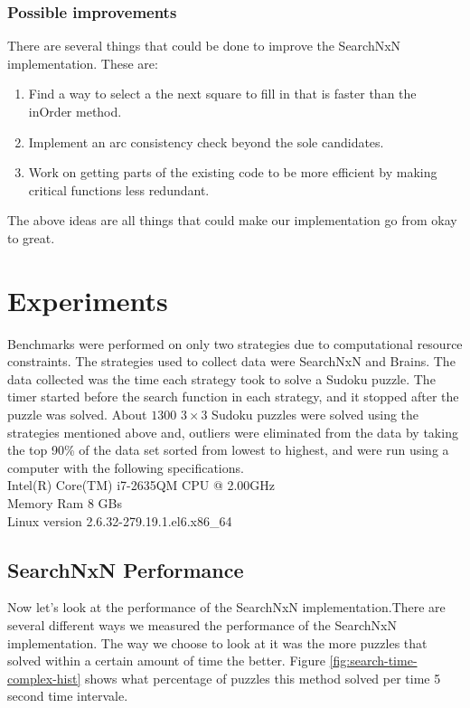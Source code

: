 \documentclass[letterpaper]{article}
\begin{document}
\subsubsection{Possible improvements}
There are several things that could be done to improve the SearchNxN implementation. These are:
\begin{enumerate}
\item Find a way to select a the next square to fill in that is faster than the inOrder method.
\item Implement an arc consistency check beyond the sole candidates.
\item Work on getting parts of the existing code to be more efficient by making critical functions less redundant. 
\end{enumerate}
The above ideas are all things that could make our implementation go from okay to great.

\section{Experiments}
Benchmarks were performed on only two strategies due to computational resource constraints. The strategies used to collect data were SearchNxN and Brains. The data collected was the time each strategy took to solve a Sudoku puzzle. The timer started before the search function in each strategy, and it stopped after the puzzle was solved. About $1300$ $3 \times 3$ Sudoku puzzles were solved using the strategies mentioned above and, outliers were eliminated from the data by taking the top 90\% of the data set sorted from lowest to highest, and were run using a computer with the following specifications.\\

Intel(R) Core(TM) i7-2635QM CPU @ 2.00GHz\\
\indent Memory Ram 8 GBs\\
\indent Linux version 2.6.32-279.19.1.el6.x86\_64

\subsection{SearchNxN Performance}
Now let's look at the performance of the SearchNxN implementation.There are several different ways we measured the performance of the SearchNxN implementation. The way we choose to look at it was the more puzzles that solved within a certain amount of time the better. Figure \ref{fig:search-time-complex-hist} shows what percentage of puzzles this method solved per time 5 second time intervale.
\end{document}

